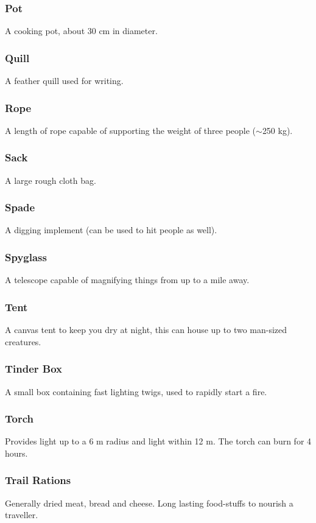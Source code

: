 \documentclass[a4paper,11pt,oneside]{book}
\newcommand{\textlf}[1]{\textbf{\titlecap{#1}}}
\begin{document}
\subsubsection*{Pot}
A cooking pot, about 30 cm in diameter.

\subsubsection*{Quill}
A feather quill used for writing.

\subsubsection*{Rope}
A length of rope capable of supporting the weight of three people ($\sim$250 kg).

\subsubsection*{Sack}
A large rough cloth bag.

\subsubsection*{Spade}
A digging implement (can be used to hit people as well).

\subsubsection*{Spyglass}
A telescope capable of magnifying things from up to a mile away.

\subsubsection*{Tent}
A canvas tent to keep you dry at night, this can house up to two man-sized creatures.

\subsubsection*{Tinder Box}
A small box containing fast lighting twigs, used to rapidly start a fire.

\subsubsection*{Torch}
Provides \textlf{full} light up to a 6 m radius and \textlf{low} light within 12 m. The torch can burn for 4 hours.

\subsubsection*{Trail Rations}
Generally dried meat, bread and cheese. Long lasting food-stuffs to nourish a traveller.
\end{document}
